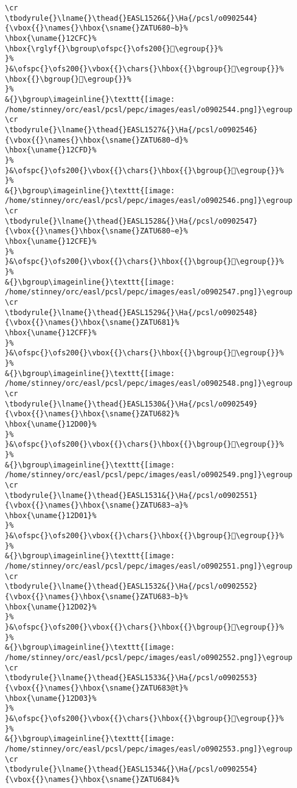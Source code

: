 \begin{verbatim}
\cr
\tbodyrule{}\lname{}\thead{}EASL1526&{}\Ha{/pcsl/o0902544}{\vbox{{}\names{}\hbox{\sname{}ZATU680∼b}%
\hbox{\uname{}12CFC}%
\hbox{\rglyf{}\bgroup\ofspc{}\ofs200{}𒳼\egroup{}}%
}%
}&\ofspc{}\ofs200{}\vbox{{}\chars{}\hbox{{}\bgroup{}𒳻\egroup{}}%
\hbox{{}\bgroup{}𒳼\egroup{}}%
}%
&{}\bgroup\imageinline{}\texttt{[image: /home/stinney/orc/easl/pcsl/pepc/images/easl/o0902544.png]}\egroup
\cr
\tbodyrule{}\lname{}\thead{}EASL1527&{}\Ha{/pcsl/o0902546}{\vbox{{}\names{}\hbox{\sname{}ZATU680∼d}%
\hbox{\uname{}12CFD}%
}%
}&\ofspc{}\ofs200{}\vbox{{}\chars{}\hbox{{}\bgroup{}𒳽\egroup{}}%
}%
&{}\bgroup\imageinline{}\texttt{[image: /home/stinney/orc/easl/pcsl/pepc/images/easl/o0902546.png]}\egroup
\cr
\tbodyrule{}\lname{}\thead{}EASL1528&{}\Ha{/pcsl/o0902547}{\vbox{{}\names{}\hbox{\sname{}ZATU680∼e}%
\hbox{\uname{}12CFE}%
}%
}&\ofspc{}\ofs200{}\vbox{{}\chars{}\hbox{{}\bgroup{}𒳾\egroup{}}%
}%
&{}\bgroup\imageinline{}\texttt{[image: /home/stinney/orc/easl/pcsl/pepc/images/easl/o0902547.png]}\egroup
\cr
\tbodyrule{}\lname{}\thead{}EASL1529&{}\Ha{/pcsl/o0902548}{\vbox{{}\names{}\hbox{\sname{}ZATU681}%
\hbox{\uname{}12CFF}%
}%
}&\ofspc{}\ofs200{}\vbox{{}\chars{}\hbox{{}\bgroup{}𒳿\egroup{}}%
}%
&{}\bgroup\imageinline{}\texttt{[image: /home/stinney/orc/easl/pcsl/pepc/images/easl/o0902548.png]}\egroup
\cr
\tbodyrule{}\lname{}\thead{}EASL1530&{}\Ha{/pcsl/o0902549}{\vbox{{}\names{}\hbox{\sname{}ZATU682}%
\hbox{\uname{}12D00}%
}%
}&\ofspc{}\ofs200{}\vbox{{}\chars{}\hbox{{}\bgroup{}𒴀\egroup{}}%
}%
&{}\bgroup\imageinline{}\texttt{[image: /home/stinney/orc/easl/pcsl/pepc/images/easl/o0902549.png]}\egroup
\cr
\tbodyrule{}\lname{}\thead{}EASL1531&{}\Ha{/pcsl/o0902551}{\vbox{{}\names{}\hbox{\sname{}ZATU683∼a}%
\hbox{\uname{}12D01}%
}%
}&\ofspc{}\ofs200{}\vbox{{}\chars{}\hbox{{}\bgroup{}𒴁\egroup{}}%
}%
&{}\bgroup\imageinline{}\texttt{[image: /home/stinney/orc/easl/pcsl/pepc/images/easl/o0902551.png]}\egroup
\cr
\tbodyrule{}\lname{}\thead{}EASL1532&{}\Ha{/pcsl/o0902552}{\vbox{{}\names{}\hbox{\sname{}ZATU683∼b}%
\hbox{\uname{}12D02}%
}%
}&\ofspc{}\ofs200{}\vbox{{}\chars{}\hbox{{}\bgroup{}𒴂\egroup{}}%
}%
&{}\bgroup\imageinline{}\texttt{[image: /home/stinney/orc/easl/pcsl/pepc/images/easl/o0902552.png]}\egroup
\cr
\tbodyrule{}\lname{}\thead{}EASL1533&{}\Ha{/pcsl/o0902553}{\vbox{{}\names{}\hbox{\sname{}ZATU683@t}%
\hbox{\uname{}12D03}%
}%
}&\ofspc{}\ofs200{}\vbox{{}\chars{}\hbox{{}\bgroup{}𒴃\egroup{}}%
}%
&{}\bgroup\imageinline{}\texttt{[image: /home/stinney/orc/easl/pcsl/pepc/images/easl/o0902553.png]}\egroup
\cr
\tbodyrule{}\lname{}\thead{}EASL1534&{}\Ha{/pcsl/o0902554}{\vbox{{}\names{}\hbox{\sname{}ZATU684}%

\end{verbatim}
